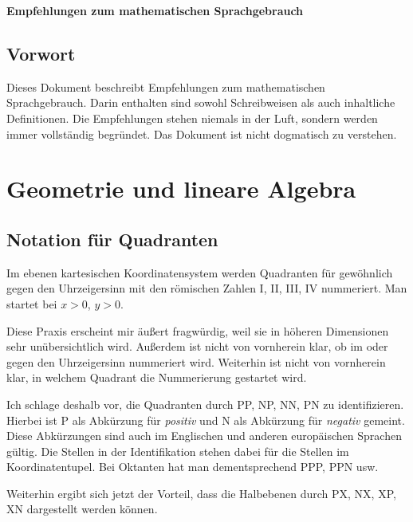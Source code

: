 \documentclass[a4paper,11pt,fleqn,twoside,BCOR=16mm]{scrartcl}
\begin{document}
\thispagestyle{empty}

\begin{huge}
\noindent
\textsf{\textbf{Empfehlungen zum mathematischen\newline
Sprachgebrauch}}
\par
\end{huge}

\tableofcontents

\subsection*{Vorwort}
Dieses Dokument beschreibt Empfehlungen zum mathematischen
Sprachgebrauch. Darin enthalten sind sowohl Schreibweisen als
auch inhaltliche Definitionen. Die Empfehlungen stehen niemals
in der Luft, sondern werden immer vollständig begründet.
Das Dokument ist nicht dogmatisch zu verstehen.

\newpage
\section{Geometrie und lineare Algebra}
\subsection{Notation für Quadranten}
Im ebenen kartesischen Koordinatensystem werden Quadranten für
gewöhnlich gegen den Uhrzeigersinn mit den römischen Zahlen
I, II, III, IV nummeriert. Man startet bei $x>0$, $y>0$.

Diese Praxis erscheint mir äußert fragwürdig, weil sie in höheren
Dimensionen sehr unübersichtlich wird. Außerdem ist nicht von
vornherein klar, ob im oder gegen den Uhrzeigersinn nummeriert wird.
Weiterhin ist nicht von vornherein klar, in welchem Quadrant
die Nummerierung gestartet wird.

Ich schlage deshalb vor, die Quadranten durch PP, NP, NN, PN
zu identifizieren. Hierbei ist P als Abkürzung für \emph{positiv}
und N als Abkürzung für \emph{negativ} gemeint. Diese Abkürzungen sind
auch im Englischen und anderen europäischen Sprachen gültig.
Die Stellen in der Identifikation stehen dabei für die Stellen
im Koordinatentupel. Bei Oktanten hat man dementsprechend PPP, PPN
usw.

Weiterhin ergibt sich jetzt der Vorteil, dass die Halbebenen durch
PX, NX, XP, XN dargestellt werden können.
\end{document}
